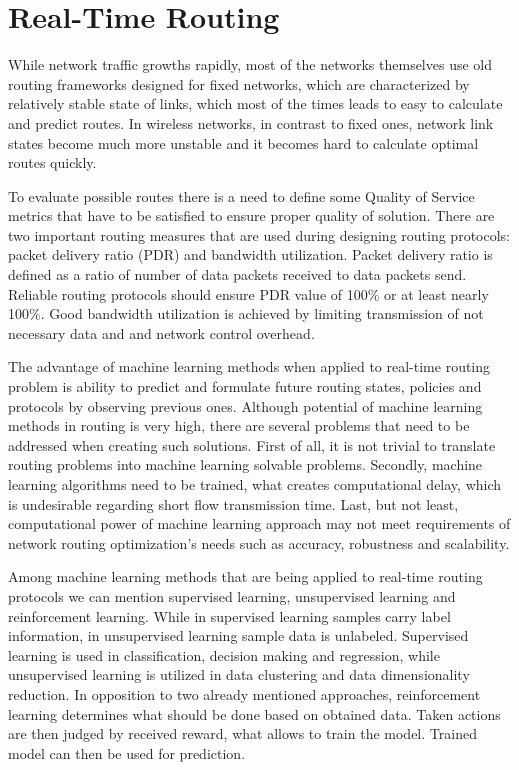 \documentclass[conference]{IEEEtran}
\begin{document}
\section{Real-Time Routing}
While network traffic growths rapidly, most of the networks themselves use old routing frameworks designed for fixed networks, which are characterized by relatively stable state of links, which most of the times leads to easy to calculate and predict routes\cite{routing1}. In wireless networks, in contrast to fixed ones, network link states become much more unstable and it becomes hard to calculate optimal routes quickly.\par
To evaluate possible routes there is a need to define some Quality of Service metrics that have to be satisfied to ensure proper quality of solution. There are two important routing measures that are used during designing routing protocols: packet delivery ratio (PDR) and bandwidth utilization. Packet delivery ratio is defined as a ratio of number of data packets received to data packets send. Reliable routing protocols should ensure PDR value of 100\% or at least nearly 100\%. Good bandwidth utilization is achieved by limiting transmission of not necessary data and and network control overhead\cite{routing3}.\par
The advantage of machine learning methods when applied to real-time routing problem is ability to predict and formulate future routing states, policies and protocols by observing previous ones\cite{routing4}. Although potential of machine learning methods in routing is very high, there are several problems that need to be addressed when creating such solutions. First of all, it is not trivial to translate routing problems into machine learning solvable problems. Secondly, machine learning algorithms need to be trained, what creates computational delay, which is undesirable regarding short flow transmission time. Last, but not least, computational power of machine learning approach may not meet requirements of network routing optimization's needs such as accuracy, robustness and scalability\cite{routing4}.\par
Among machine learning methods that are being applied to real-time routing protocols we can mention supervised learning, unsupervised learning and reinforcement learning\cite{routing3}. While in supervised learning samples carry label information, in unsupervised learning sample data is unlabeled. Supervised learning is used in classification, decision making and regression, while unsupervised learning is utilized in data clustering and data dimensionality reduction. In opposition to two already mentioned approaches, reinforcement learning determines what should be done based on obtained data. Taken actions are then judged by received reward, what allows to train the model. Trained model can then be used for prediction\cite{routing4}.\par
\end{document}
